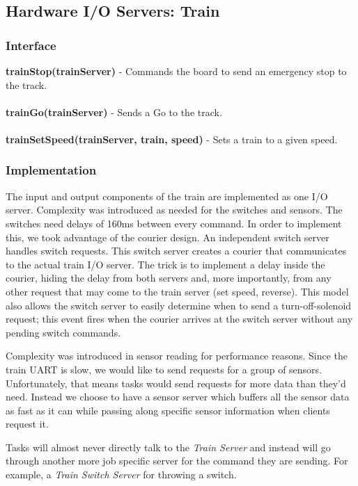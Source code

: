 \documentclass[twoside,a4paper]{refart}
\begin{document}
\subsection{Hardware I/O Servers: Train}

\subsubsection{Interface}
\textbf{trainStop(trainServer)} - Commands the board to send an emergency stop to the track.\\\\
\textbf{trainGo(trainServer)} - Sends a Go to the track.\\\\
\textbf{trainSetSpeed(trainServer, train, speed)} - Sets a train to a given speed.

\subsubsection{Implementation}
The input and output components of the train are implemented as one I/O server. Complexity was introduced as needed for the switches and sensors. The switches need delays of 160ms between every command. In order to implement this, we took advantage of the courier design. An independent switch server handles switch requests. This switch server creates a courier that communicates to the actual train I/O server. The trick is to implement a delay inside the courier, hiding the delay from both servers and, more importantly, from any other request that may come to the train server (set speed, reverse). This model also allows the switch server to easily determine when to send a turn-off-solenoid request; this event fires when the courier arrives at the switch server without any pending switch commands.

Complexity was introduced in sensor reading for performance reasons. Since the train UART is slow, we would like to send requests for a group of sensors. Unfortunately, that means tasks would send requests for more data than they’d need. Instead we choose to have a sensor server which buffers all the sensor data as fast as it can while passing along specific sensor information when clients request it.

Tasks will almost never directly talk to the \textit{Train Server} and instead will go through another more job specific server for the command they are sending. For example, a \textit{Train Switch Server} for throwing a switch.
\end{document}
